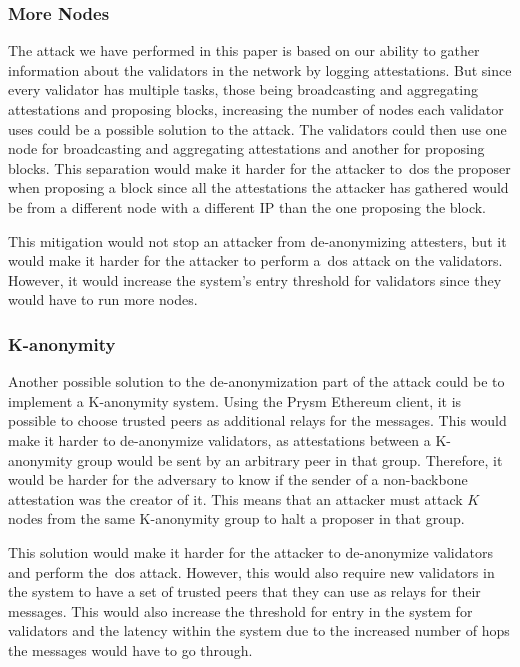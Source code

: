 \subsubsection{More Nodes}\label{subsubsec:more-nodes}
The attack we have performed in this paper is based on our ability to gather information about the validators in the network by logging attestations.
But since every validator has multiple tasks, those being broadcasting and aggregating attestations and proposing blocks, increasing the number of nodes each validator uses could be a possible solution to the attack.
The validators could then use one node for broadcasting and aggregating attestations and another for proposing blocks.
This separation would make it harder for the attacker to~\gls{dos} the proposer when proposing a block since all the attestations the attacker has gathered would be from a different node with a different IP than the one proposing the block.

This mitigation would not stop an attacker from de-anonymizing attesters, but it would make it harder for the attacker to perform a~\gls{dos} attack on the validators.
However, it would increase the system's entry threshold for validators since they would have to run more nodes.

\subsubsection{K-anonymity}\label{subsubsec:k-anonymity}
Another possible solution to the de-anonymization part of the attack could be to implement a K-anonymity system.
Using the Prysm Ethereum client, it is possible to choose trusted peers as additional relays for the messages.
This would make it harder to de-anonymize validators, as attestations between a K-anonymity group would be sent by an arbitrary peer in that group.
Therefore, it would be harder for the adversary to know if the sender of a non-backbone attestation was the creator of it.
This means that an attacker must attack $K$ nodes from the same K-anonymity group to halt a proposer in that group.

This solution would make it harder for the attacker to de-anonymize validators and perform the~\gls{dos} attack.
However, this would also require new validators in the system to have a set of trusted peers that they can use as relays for their messages.
This would also increase the threshold for entry in the system for validators and the latency within the system due to the increased number of hops the messages would have to go through.


